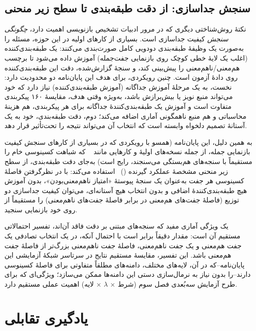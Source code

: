 \subsection{سنجش جداسازی: از دقت طبقه‌بندی تا سطح زیر منحنی}
نکتهٔ روش‌شناختی دیگری که در مرور ادبیات تشخیص بازنویسی اهمیت دارد، \emph{چگونگی سنجش} کیفیت جداسازی است. بسیاری از کارهای اولیه در این حوزه، مسئله را به‌صورت یک وظیفهٔ طبقه‌بندی دودویی کامل صورت‌بندی می‌کنند: یک طبقه‌بندی‌کننده (اغلب یک لایهٔ خطی کوچک روی بازنمایی جفت‌جمله) آموزش داده می‌شود تا برچسب هم‌معنی/ناهم‌معنی را پیش‌بینی کند، و سنجهٔ گزارش‌شده، دقت این طبقه‌بندی‌کننده روی دادهٔ آزمون است. چنین رویکردی، برای هدف این پایان‌نامه دو محدودیت دارد: نخست، به یک مرحلهٔ آموزش جداگانه (آموزش طبقه‌بندی‌کننده) نیاز دارد که خود می‌تواند منبع نویز یا بیش‌برازش باشد، به‌ویژه وقتی هدف، مقایسهٔ ۱۶۰ پیکربندی متفاوت است و آموزش یک طبقه‌بندی‌کنندهٔ جداگانه برای هر پیکربندی، هم هزینهٔ محاسباتی و هم منبع ناهمگونی آماری اضافه می‌کند؛ دوم، دقت طبقه‌بندی، خود به یک آستانهٔ تصمیم دلخواه وابسته است که انتخاب آن می‌تواند نتیجه را تحت‌تأثیر قرار دهد.

به همین دلیل، این پایان‌نامه (همسو با رویکردی که در بسیاری از کارهای سنجش کیفیت بازنمایی جمله، از جمله نسخه‌های اولیهٔ
و کارهایی مانند
~\cite{reimers2019sbert}
که شباهت کسینوسی خام را مستقیماً با سنجه‌های هم‌بستگی می‌سنجند، رایج است) به‌جای دقت طبقه‌بندی، از سطح زیر منحنی مشخصهٔ عملکرد گیرنده
()~\cite{fawcett2006roc}
استفاده می‌کند: با در نظرگرفتن فاصلهٔ کسینوسی هر جفت به‌عنوان یک سنجهٔ پیوستهٔ «امتیاز ناهم‌معنی‌بودن»، بدون آموزش هیچ طبقه‌بندی‌کنندهٔ اضافی و بدون انتخاب هیچ آستانه‌ای، می‌توان کیفیت جداسازی دو توزیع (فاصلهٔ جفت‌های هم‌معنی در برابر فاصلهٔ جفت‌های ناهم‌معنی) را مستقیماً از روی خود بازنمایی سنجید.

یک ویژگی آماری مفید
که سنجه‌های مبتنی بر دقت فاقد آن‌اند، تفسیر احتمالاتی مستقیم آن است: مقدار
دقیقاً برابر است با احتمال آنکه، در یک انتخاب تصادفی یک جفت هم‌معنی و یک جفت ناهم‌معنی، فاصلهٔ جفت ناهم‌معنی بزرگ‌تر از فاصلهٔ جفت هم‌معنی باشد. این تفسیر، مقایسهٔ مستقیم نتایج در سرتاسر شبکهٔ آزمایشی این پایان‌نامه--که در آن، لایه‌های مختلف، دامنه‌های مطلقاً متفاوتی برای فاصلهٔ کسینوسی دارند--را بدون نیاز به نرمال‌سازی دستی این دامنه‌ها ممکن می‌سازد؛ ویژگی‌ای که برای طرح آزمایش سه‌بُعدی فصل سوم (شرط × $\lambda$ × لایه) اهمیت عملی مستقیم دارد.

\section{یادگیری تقابلی}
\label{sec:lit-contrastive}

